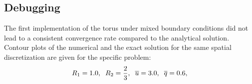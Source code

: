 \documentclass[a4paper,12pt]{article}
\makeatletter
\newenvironment{figurehere}
  {\def\@captype{figure}}
  {}
\makeatother
\begin{document}
\subsection{Debugging}
The first implementation of the torus under mixed boundary conditions did not lead to a consistent convergence rate compared to the analytical solution.
Contour plots of the numerical and the exact solution for the same spatial discretization are given for the specific problem:
\begin{eqnarray}
R_1 = 1.0,\hspace{0.2cm}
R_2 = \frac{2}{3},\hspace{0.2cm}
\overline{u} = 3.0,\hspace{0.2cm}
\overline{q} = 0.6,
\end{eqnarray}
\begin{center}
\begin{figurehere}
\\

\end{figurehere}
\end{center}
\end{document}
